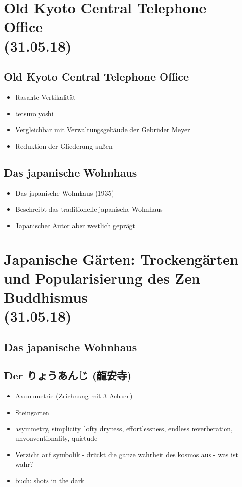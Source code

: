 \documentclass[emulatestandardclasses]{scrartcl}
\begin{document}
\section{Old Kyoto Central Telephone Office
\\(31.05.18)}

\subsection{Old Kyoto Central Telephone Office}

\begin{itemize}
  \item Rasante Vertikalität
  \item tetsuro yoshi
  \item Vergleichbar mit Verwaltungsgebäude der Gebrüder Meyer
  \item Reduktion der Gliederung außen
\end{itemize}

\subsection{Das japanische Wohnhaus}

\begin{itemize}
  \item Das japanische Wohnhaus (1935)
  \item Beschreibt das traditionelle japanische Wohnhaus
  \item Japanischer Autor aber westlich geprägt
\end{itemize}

\section{Japanische Gärten: Trockengärten und Popularisierung des Zen Buddhismus
\\(31.05.18)}

\subsection{Das japanische Wohnhaus}

\subsection{Der りょうあんじ (龍安寺)}

\begin{itemize}
  \item Axonometrie (Zeichnung mit 3 Achsen)
  \item Steingarten
  \item asymmetry, simplicity, lofty dryness, effortlessness, endless reverberation, unvonventionality, quietude
  \item Verzicht auf symbolik - drückt die ganze wahrheit des kosmos aus - was ist wahr?
  \item buch: shots in the dark
\end{itemize}
\end{document}
